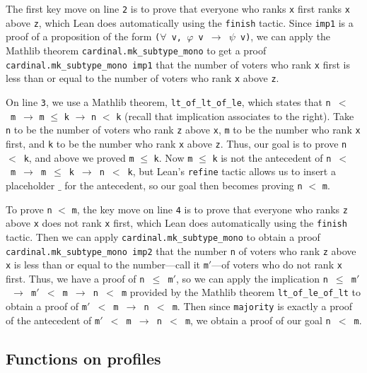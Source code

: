 \documentclass[runningheads]{llncs}
\begin{document}
The first key move on line \texttt{2} is to prove that everyone who ranks \texttt{x} first ranks \texttt{x} above \texttt{z}, which Lean  does automatically using the \texttt{finish} tactic. Since \texttt{imp1} is a proof of a proposition of the form \texttt{($\forall$ v, $\varphi$ v $\to$ $\psi$ v)}, we can apply the Mathlib theorem \texttt{cardinal.mk\_subtype\_mono} to get a proof \texttt{cardinal.mk\_subtype\_mono imp1} that the number of voters who rank \texttt{x} first is less than or equal to the number of voters who rank \texttt{x} above \texttt{z}.

On line \texttt{3}, we use a Mathlib theorem, \texttt{lt\_of\_lt\_of\_le}, which states that \texttt{n}~$<$~\texttt{m}~$\to$ \texttt{m} $\leq$ \texttt{k} $\to$ \texttt{n} $<$ \texttt{k} (recall that implication associates to the right). Take \texttt{n} to be the number of voters who rank \texttt{z} above \texttt{x}, \texttt{m} to be the number who rank \texttt{x} first, and \texttt{k} to be the number  who rank \texttt{x} above \texttt{z}. Thus, our goal is to prove \texttt{n}~$<$~\texttt{k}, and above we proved  \texttt{m} $\leq$ \texttt{k}. Now \texttt{m} $\leq$ \texttt{k} is not the antecedent of \texttt{n}~$<$~\texttt{m}~$\to$~\texttt{m}~$\leq$~\texttt{k}~$\to$~\texttt{n}~$<$~\texttt{k}, but Lean's \texttt{refine} tactic allows us to insert a placeholder $\_$ for the antecedent, so our goal then becomes proving  \texttt{n} $<$ \texttt{m}. 

To prove \texttt{n} $<$ \texttt{m}, the key move on line \texttt{4} is to prove that everyone who ranks \texttt{z} above \texttt{x} does not rank \texttt{x} first, which Lean does automatically using the \texttt{finish} tactic. Then we can apply \texttt{cardinal.mk\_subtype\_mono} to obtain a proof \texttt{cardinal.mk\_subtype\_mono imp2} that the number \texttt{n} of voters who rank \texttt{z} above \texttt{x} is less than or equal to the number---call it \texttt{m}$'$---of voters who do not rank \texttt{x} first. Thus, we have a proof of \texttt{n~$\leq$~m$'$}, so we can apply the implication  \texttt{n~$\leq$~m$'$~$\to$~m$'$~$<$~m~$\to$~n~$<$ m} provided by the Mathlib theorem \texttt{lt\_of\_le\_of\_lt} to obtain a proof of \texttt{m$'$  $<$ m $\to$ n $<$ m}. Then since \texttt{majority} is exactly a proof of the antecedent of \texttt{m$'$  $<$ m $\to$ n $<$ m}, we obtain a proof of our goal \texttt{n $<$ m}.

\subsection{Functions on profiles}
\end{document}

